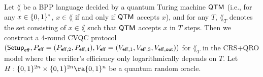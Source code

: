 \begin{itemize}
\end{itemize}



Let $\lang$ be a BPP language decided by a quantum Turing machine $\mathsf{QTM}$ (i.e., for any $x\in \{0,1\}^*$, $x\in \lang$ if and only if $\mathsf{QTM}$ accepts $x$),
and for any $T$, $\lang_T$ denotes the set consisting of $x\in \lang$ such that 
$\mathsf{QTM}$ accepts $x$ in $T$ steps.
Then we construct a 4-round CVQC protocol $(\mathsf{Setup}_{\mathsf{eff}},P_{\mathsf{eff}}=(P_{\mathsf{eff},2},P_{\mathsf{eff},4}),V_{\mathsf{eff}}=(V_{\mathsf{eff},1},V_{\mathsf{eff},3},V_{\mathsf{eff},\mathsf{out}}))$ for $\lang_T$ in the CRS+QRO model where the verifier's efficiency only logarithmically depends on $T$.
Let $H:\bit^{2\secpar}\times \bit^{2\secpar}\ra \bit^{\secpar}$ be a quantum random oracle. 

